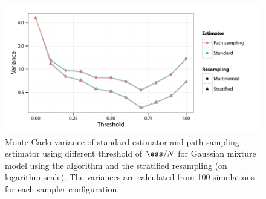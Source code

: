 \begin{figure}[t]
  \UseAltLinespread
  \includegraphics[width=\linewidth]{fig_src/GMM_Resample}
  \caption[Variance of standard standard estimator and path sampling using
  adaptive resampling]
  {Monte Carlo variance of standard estimator and path sampling estimator using different threshold of $\ess/N$ for Gaussian mixture model using the \smc[2] algorithm and the stratified resampling (on logarithm scale). The variances are calculated from 100 simulations for each sampler configuration.}
  \label{fig:gmm resample}
\end{figure}
